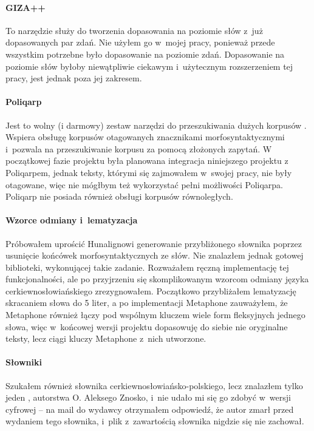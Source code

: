 \documentclass{pracamgr}
\begin{document}
\paragraph{GIZA++}
To narzędzie \cite{giza} służy do tworzenia dopasowania na poziomie
słów z~już dopasowanych par zdań. Nie użyłem go w~mojej pracy,
ponieważ przede wszystkim potrzebne było dopasowanie na poziomie
zdań. Dopasowanie na poziomie słów byłoby niewątpliwie ciekawym
i~użytecznym rozszerzeniem tej pracy, jest jednak poza jej zakresem.

\paragraph{Poliqarp}
Jest to wolny (i darmowy) zestaw narzędzi do przeszukiwania dużych
korpusów \cite{poliqarp}. Wspiera obsługę korpusów otagowanych
znacznikami morfosyntaktycznymi i~pozwala na przeszukiwanie korpusu za
pomocą złożonych zapytań. W początkowej fazie projektu była planowana
integracja niniejszego projektu z Poliqarpem, jednak teksty, którymi
się zajmowałem w~swojej pracy, nie były otagowane, więc nie mógłbym
też wykorzystać pełni możliwości Poliqarpa. Poliqarp nie posiada
również obsługi korpusów równoległych.

\paragraph{Wzorce odmiany i~lematyzacja}
Próbowałem uprościć Hunalignowi generowanie przybliżonego słownika
poprzez usunięcie końcówek morfosyntaktycznych ze słów. Nie znalazłem
jednak gotowej biblioteki, wykonującej takie zadanie. Rozważałem
ręczną implementację tej funkcjonalności, ale po przyjrzeniu się
skomplikowanym wzorcom odmiany języka cerkiewno\-{}słowiańskiego
\cite{strach} zrezygnowałem. Początkowo przybliżałem lematyzację
skracaniem słowa do 5 liter, a po implementacji Metaphone zauważyłem,
że Metaphone również łączy pod wspólnym kluczem wiele form fleksyjnych
jednego słowa, więc w~końcowej wersji projektu dopasowuję do siebie
nie oryginalne teksty, lecz ciągi kluczy Metaphone z~nich utworzone.

\paragraph{Słowniki}
Szukałem również słownika cerkiewno\-{}słowiańsko-polskiego, lecz
znalazłem tylko jeden \cite{znosko}, autorstwa O. Aleksego Znosko,
i~nie udało mi się go zdobyć w~wersji cyfrowej -- na mail do wydawcy
otrzymałem odpowiedź, że autor zmarł przed wydaniem tego słownika,
i~plik z~zawartością słownika nigdzie się nie zachował.
\end{document}

